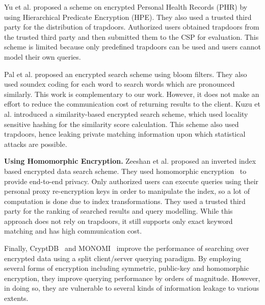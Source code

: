 Yu et al. \cite{li} proposed a scheme on encrypted Personal Health Records
(PHR) by using Hierarchical Predicate Encryption (HPE). They also used a 
trusted third party for the distribution of trapdoors. 
Authorized users obtained trapdoors from the trusted third party and then 
submitted them to the CSP for evaluation. This scheme is limited because only 
predefined trapdoors can be used and users cannot model their own queries.

Pal et al. \cite{saibal} proposed an encrypted search scheme using bloom filters. They
also used soundex coding\cite{odell1918soundex} for each word to search words
which are pronounced similarly. This work is complementary to our work. However, it
does not make an effort to reduce the communication cost of returning results to the
client. Kuzu et al.\cite{mehmat} introduced a similarity-based encrypted search scheme,
which used locality sensitive hashing for the similarity score calculation.
This scheme also used trapdoors, hence leaking private matching information
upon which statistical attacks are possible. 


\textbf{Using Homomorphic Encryption.}
Zeeshan et al.\cite{zeehan} proposed an inverted index based encrypted data search scheme.
They used homomorphic encryption~\cite{craig} to provide end-to-end privacy. Only
authorized users can execute queries using their personal proxy re-encryption keys in
order to manipulate the index, so a lot of computation is done due to index
transformations. They used a trusted third party for the ranking of searched results and query 
modelling. While this approach does not rely on trapdoors, it still supports only
exact keyword matching and has high communication cost.

Finally, CryptDB~\cite{popa2011cryptdb} and MONOMI~\cite{tu2013processing} improve the performance of searching over encrypted data using
a split client/server querying paradigm. By employing several forms of encryption including
symmetric, public-key and homomorphic encryption, they improve querying performance by orders
of magnitude. However, in doing so, they are vulnerable to several kinds of information leakage to various extents.
